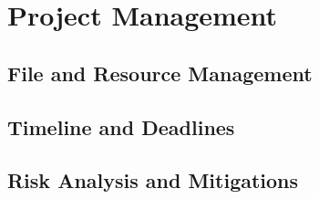 \documentclass[12pt]{article}  %
\theoremstyle{definition}
\theoremstyle{remark}
\begin{document}
\newpage                     %
\section{Project Management}\label{ss:back}

\subsection {File and Resource Management}

\subsection {Timeline and Deadlines}

\subsection {Risk Analysis and Mitigations}
\end{document}
